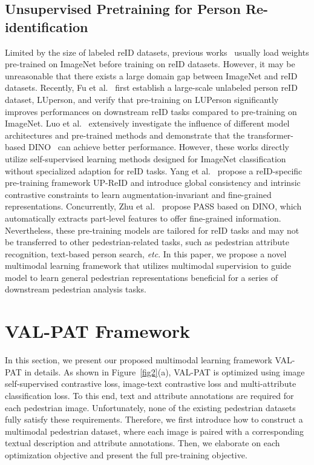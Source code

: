 \documentclass[final]{cvpr}
\begin{document}
\subsection{Unsupervised Pretraining for Person Re-identification}
\vspace{-2mm}
Limited by the size of labeled reID datasets, previous works~\cite{dai2019batch,sun2018beyond,he2021transreid} usually load weights pre-trained on ImageNet before training on reID datasets.
However, it may be unreasonable that there exists a large domain gap between ImageNet and reID datasets.
Recently, Fu et al.~\cite{fu2021unsupervised} first establish a large-scale unlabeled person reID dataset, LUperson, and verify that pre-training on LUPerson significantly improves performances on downstream reID tasks compared to pre-training on ImageNet.
Luo et al.~\cite{luo2021self} extensively investigate the influence of different model architectures and pre-trained methods and demonstrate that the transformer-based DINO~\cite{caron2021emerging} can achieve better performance.
However, these works directly utilize self-supervised learning methods designed for ImageNet classification without specialized adaption for reID tasks.
Yang et al.~\cite{yang2022unleashing} propose a reID-specific pre-training framework UP-ReID and introduce global consistency and intrinsic contrastive constraints to learn augmentation-invariant and fine-grained representations.
Concurrently, Zhu et al.~\cite{zhu2022pass} propose PASS based on DINO, which automatically extracts part-level features to offer fine-grained information.
Nevertheless, these pre-training models are tailored for reID tasks and may not be transferred to other pedestrian-related tasks, such as pedestrian attribute recognition, text-based person search, \emph{etc}.
In this paper, we propose a novel multimodal learning framework that utilizes multimodal supervision to guide model to learn general pedestrian representations beneficial for a series of downstream pedestrian analysis tasks.














\section{VAL-PAT Framework}
In this section, we present our proposed multimodal learning framework VAL-PAT in details.
As shown in Figure~\ref{fig2}(a), VAL-PAT is optimized using image self-supervised contrastive loss, image-text contrastive loss and multi-attribute classification loss.
To this end, text and attribute annotations are required for each pedestrian image.
Unfortunately, none of the existing pedestrian datasets fully satisfy these requirements.
Therefore, we first introduce how to construct a multimodal pedestrian dataset, where each image is paired with a corresponding textual description and attribute annotations.
Then, we elaborate on each optimization objective and present the full pre-training objective.
\end{document}
